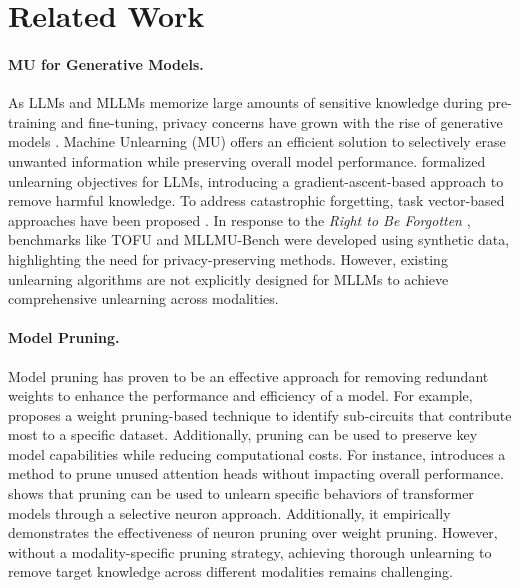 \section{Related Work}
\paragraph{MU for Generative Models.}
As LLMs and MLLMs memorize large amounts of sensitive knowledge during pre-training and fine-tuning, privacy concerns have grown with the rise of generative models \cite{liu2024shield, nasr2023scalable, liu2024machine, zhang2023counterfactual}. 
Machine Unlearning (MU) offers an efficient solution to selectively erase unwanted information while preserving overall model performance. \citet{yao2023large} formalized unlearning objectives for LLMs, introducing a gradient-ascent-based approach to remove harmful knowledge. 
To address catastrophic forgetting, task vector-based approaches have been proposed \cite{ilharco2022editing, liu2024towards, dou2024avoiding}. In response to the \textit{Right to Be Forgotten} \cite{dang2021right, bourtoule2021machine}, benchmarks like TOFU \cite{maini2024tofu} and MLLMU-Bench \cite{liu2024protecting} were developed using synthetic data, highlighting the need for privacy-preserving methods. However, existing unlearning algorithms are not explicitly designed for MLLMs to achieve comprehensive unlearning across modalities.


\paragraph{Model Pruning.}
Model pruning has proven to be an effective approach for removing redundant weights to enhance the performance and efficiency of a model. 
For example, \citet{conmy2023towards} proposes a weight pruning-based technique to identify sub-circuits that contribute most to a specific dataset. Additionally, pruning can be used to preserve key model capabilities while reducing computational costs. 
For instance, \citet{michel2019sixteen} introduces a method to prune unused attention heads without impacting overall performance. 
\citet{pochinkov2024dissecting} shows that pruning can be used to unlearn specific behaviors of transformer models through a selective neuron approach. 
Additionally, it empirically demonstrates the effectiveness of neuron pruning over weight pruning. However, without a modality-specific pruning strategy, achieving thorough unlearning to remove target knowledge across different modalities remains challenging.